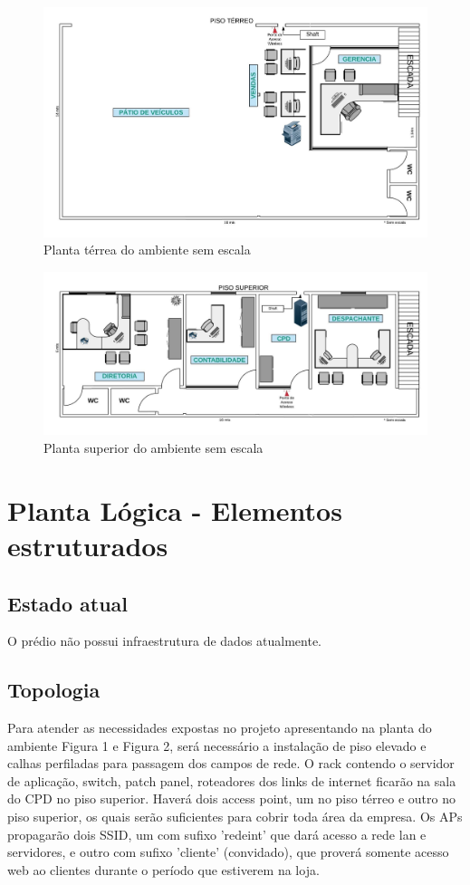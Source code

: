 \documentclass[	DIV=calc,%
							paper=a4,%
							fontsize=12pt,%
							onecolumn]{scrartcl}	 					%
\begin{document}
\begin{figure}[H]
	\centering
	\includegraphics[width=\textwidth]{PlantadoAmbienteTerreo}
	\caption{Planta térrea do ambiente sem escala}
	\label{fig1}
\end{figure}

\begin{figure}[H]
	\centering
	\includegraphics[width=\textwidth]{PlantadoAmbienteSuperior}
	\caption{Planta superior do ambiente sem escala}
	\label{fig2}
\end{figure}

\section{Planta Lógica - Elementos estruturados}

\subsection{Estado atual}
O prédio não possui infraestrutura de dados atualmente.

\subsection{Topologia}
Para atender as necessidades expostas no projeto apresentando na planta do ambiente Figura 1 e Figura 2, será necessário a instalação de piso elevado e calhas perfiladas para passagem dos campos de rede. 
O rack contendo o servidor de aplicação, switch, patch panel, roteadores dos links de internet ficarão na sala do CPD no piso superior.
Haverá dois access point, um no piso térreo e outro no piso superior, os quais serão suficientes para cobrir toda área da empresa. Os APs propagarão dois SSID, um
com sufixo 'redeint' que dará acesso a rede lan e servidores, e outro com sufixo 'cliente' (convidado), que proverá somente acesso web ao clientes durante o período que estiverem na loja.
\end{document}
